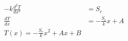 \begin{align}
-k\frac{d^2T}{dx^2} &= S_e \\
\frac{dT}{dx} & = -\frac{S_e}{k}x + A \\
T(x) = -\frac{S_e}{k}x^2 + Ax + B
\end{align}

